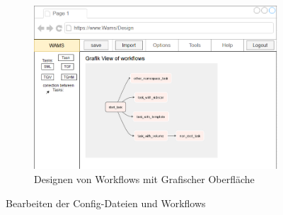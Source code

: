 \begin{figure}[ht]
\begin{subfigure}{.75\textwidth}
        \includegraphics[width = \textwidth]{Grafiken/Gui Mockups/workflowGui-Design.drawio.png}
        \caption{Designen von Workflows mit Grafischer Oberfläche}
        \label{fig:sfigGraficDesign}
   \end{subfigure}
   \caption{Bearbeiten der Config-Dateien und Workflows}
   \label{fig:Abb 4}
\end{figure}
    
